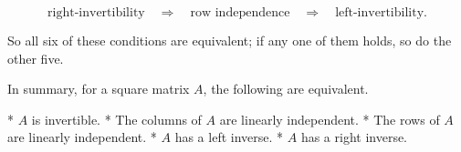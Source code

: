 \[\mbox{right-invertibility}\quad\Longrightarrow\quad\mbox{row independence}\quad \Longrightarrow\quad\mbox{left-invertibility}.\]

So all six of these conditions are equivalent; if any one of them holds, so do the other five.

In summary, for a square matrix \(A\), the following are equivalent.

* \(A\) is invertible.
* The columns of \(A\) are linearly independent.
* The rows of \(A\) are linearly independent.
* \(A\) has a left inverse.
* \(A\) has a right inverse.

 